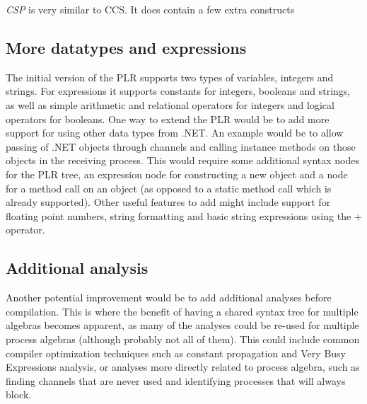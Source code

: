 	\textit{CSP} is very similar to CCS. It does contain a few extra constructs
	
	
	\subsection{More datatypes and expressions}
	The initial version of the PLR supports two types of variables, integers and 
	strings. For expressions it supports constants for integers, booleans and 
	strings, as well as simple arithmetic and relational operators for integers 
	and logical operators for booleans. One way to extend the PLR would be to 
	add more support for using other data types from .NET. An example would be 
	to allow passing of .NET objects through channels and calling instance 
	methods on those objects in the receiving process. This would require some 
	additional syntax nodes for the PLR tree, an expression node for 
	constructing a new object and a node for a method call on an object (as 
	opposed to a static method call which is already supported). Other useful 
	features to add might include support for floating point numbers, string 
	formatting and basic string expressions using the + operator.
	
	\subsection{Additional analysis}
	
	Another potential improvement would be to add additional analyses before 
	compilation. This is where the benefit of having a shared syntax tree for 
	multiple algebras becomes apparent, as many of the analyses could be re-used 
	for multiple process algebras (although probably not all of them). This 
	could include common compiler optimization techniques such as constant 
	propagation and Very Busy Expressions analysis, or analyses more directly 
	related to process algebra, such as finding channels that are never used
	and identifying processes that will always block.
	

